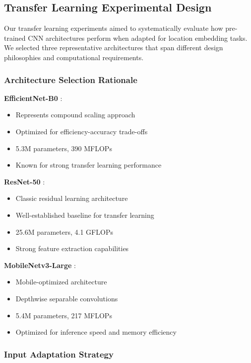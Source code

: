 \subsection{Transfer Learning Experimental Design}

Our transfer learning experiments aimed to systematically evaluate how pre-trained CNN architectures perform when adapted for location embedding tasks. We selected three representative architectures that span different design philosophies and computational requirements.

\subsubsection{Architecture Selection Rationale}

\textbf{EfficientNet-B0} \cite{tan2019efficientnet}:
\begin{itemize}
    \item Represents compound scaling approach
    \item Optimized for efficiency-accuracy trade-offs
    \item 5.3M parameters, 390 MFLOPs
    \item Known for strong transfer learning performance
\end{itemize}

\textbf{ResNet-50} \cite{he2016resnet}:
\begin{itemize}
    \item Classic residual learning architecture
    \item Well-established baseline for transfer learning
    \item 25.6M parameters, 4.1 GFLOPs
    \item Strong feature extraction capabilities
\end{itemize}

\textbf{MobileNetv3-Large} \cite{howard2019mobilenetv3}:
\begin{itemize}
    \item Mobile-optimized architecture
    \item Depthwise separable convolutions
    \item 5.4M parameters, 217 MFLOPs
    \item Optimized for inference speed and memory efficiency
\end{itemize}

\subsubsection{Input Adaptation Strategy}


